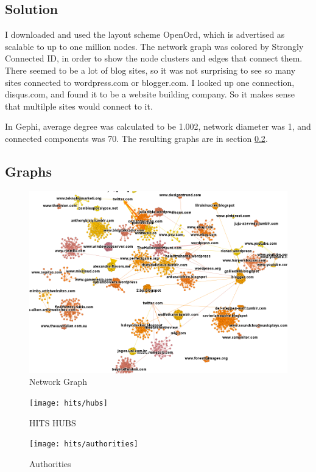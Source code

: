 \documentclass[paper=a4, fontsize=11pt]{scrartcl} %
\numberwithin{equation}{section} %
\numberwithin{figure}{section} %
\numberwithin{table}{section} %
\begin{document}
\subsection{Solution}
I downloaded and used the layout scheme OpenOrd, which is advertised as scalable to up to one million nodes.
The network graph was colored by Strongly Connected ID, in order to show the node clusters and edges that connect them.
There seemed to be a lot of blog sites, so it was not surprising to see so many sites connected to wordpress.com or blogger.com.
I looked up one connection, disqus.com, and found it to be a website building company. 
So it makes sense that multilple sites would connect to it.

In Gephi, average degree was calculated to be 1.002, network diameter was 1, and connected components was 70.
The resulting graphs are in section \ref{sec:graphs}.

\subsection{Graphs}
\label{sec:graphs}
\begin{figure}[H]
\includegraphics[width=1\textwidth]{graph1-2}
\caption{Network Graph}
\label{fig:network}
\end{figure}

\begin{figure}[H]
\texttt{[image: hits/hubs]}
\caption{HITS HUBS}
\label{fig:hubs}
\end{figure}

\begin{figure}[H]
\texttt{[image: hits/authorities]}
\caption{Authorities}
\label{fig:auth}
\end{figure}
\end{document}
